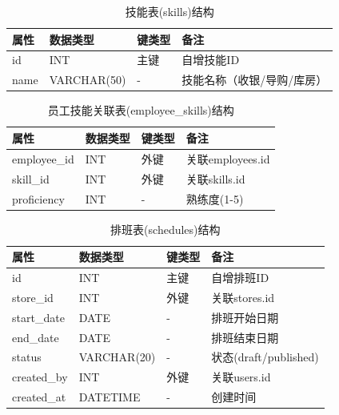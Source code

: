 \documentclass{ctexart}
\begin{document}
\begin{table}[H]
    \centering
    \caption{技能表(skills)结构}
    \label{tab:skills-table}
    \begin{tabular}{llll}
    \toprule
    属性 & 数据类型 & 键类型 & 备注 \\
    \midrule
    id & INT & 主键 & 自增技能ID \\
    name & VARCHAR(50) & - & 技能名称（收银/导购/库房） \\
    \bottomrule
    \end{tabular}
\end{table}

\begin{table}[H]
    \centering
    \caption{员工技能关联表(employee\_skills)结构}
    \label{tab:employee-skills-table}
    \begin{tabular}{llll}
    \toprule
    属性 & 数据类型 & 键类型 & 备注 \\
    \midrule
    employee\_id & INT & 外键 & 关联employees.id \\
    skill\_id & INT & 外键 & 关联skills.id \\
    proficiency & INT & - & 熟练度(1-5) \\
    \bottomrule
    \end{tabular}
\end{table}

\begin{table}[H]
    \centering
    \caption{排班表(schedules)结构}
    \label{tab:schedules-table}
    \begin{tabular}{llll}
    \toprule
    属性 & 数据类型 & 键类型 & 备注 \\
    \midrule
    id & INT & 主键 & 自增排班ID \\
    store\_id & INT & 外键 & 关联stores.id \\
    start\_date & DATE & - & 排班开始日期 \\
    end\_date & DATE & - & 排班结束日期 \\
    status & VARCHAR(20) & - & 状态(draft/published) \\
    created\_by & INT & 外键 & 关联users.id \\
    created\_at & DATETIME & - & 创建时间 \\
    \bottomrule
    \end{tabular}
\end{table}
\end{document}

